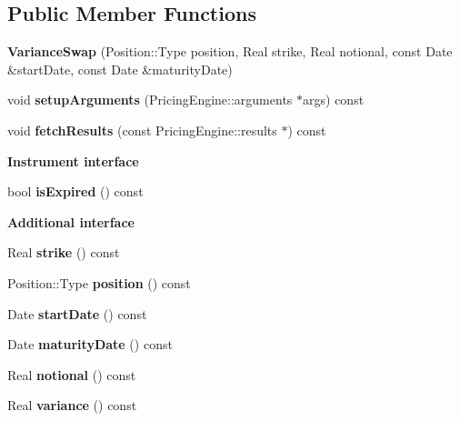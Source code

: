 \subsection*{Public Member Functions}
\begin{DoxyCompactItemize}
\item 
{\bfseries Variance\+Swap} (Position\+::\+Type position, Real strike, Real notional, const Date \&start\+Date, const Date \&maturity\+Date)\label{class_quant_lib_1_1_variance_swap_a531be199ed9b567e424f9d03c81521d3}

\item 
void {\bfseries setup\+Arguments} (Pricing\+Engine\+::arguments $\ast$args) const \label{class_quant_lib_1_1_variance_swap_a54917efb14f856bacfae1ae03e9099e9}

\item 
void {\bfseries fetch\+Results} (const Pricing\+Engine\+::results $\ast$) const \label{class_quant_lib_1_1_variance_swap_ab1f588cd7b834f0c56b19c7418384089}

\end{DoxyCompactItemize}
\begin{Indent}{\bf Instrument interface}\par
\begin{DoxyCompactItemize}
\item 
bool {\bfseries is\+Expired} () const \label{class_quant_lib_1_1_variance_swap_a66c9af22e2d11dae6640f333f914c955}

\end{DoxyCompactItemize}
\end{Indent}
\begin{Indent}{\bf Additional interface}\par
\begin{DoxyCompactItemize}
\item 
Real {\bfseries strike} () const \label{class_quant_lib_1_1_variance_swap_a295d12019f655252a2bbebedc5583f06}

\item 
Position\+::\+Type {\bfseries position} () const \label{class_quant_lib_1_1_variance_swap_ae747fa927e228cbbbe95fa761f977bb7}

\item 
Date {\bfseries start\+Date} () const \label{class_quant_lib_1_1_variance_swap_a633ad08c5dac3509b1e09bbe72ea96eb}

\item 
Date {\bfseries maturity\+Date} () const \label{class_quant_lib_1_1_variance_swap_afad4c81a960870471a9a209198f8f139}

\item 
Real {\bfseries notional} () const \label{class_quant_lib_1_1_variance_swap_a12ac3276b87405a3955c784979a1e5df}

\item 
Real {\bfseries variance} () const \label{class_quant_lib_1_1_variance_swap_aca9f14c02afacb796dd33828b7011530}

\end{DoxyCompactItemize}
\end{Indent}
